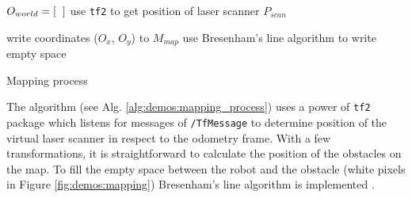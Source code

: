 \vspace*{.4cm}
\begin{algorithm}[H]

$ O_{world} = [\hspace{2mm}] $ 
use \texttt{tf2} to get position of laser scanner $ P_{scan} $\;


write coordinates ($O_{x}$, $O_{y}$) to $ M_{map} $\;
use Bresenham's line algorithm to write empty space\;

\caption{Mapping process}
\label{alg:demos:mapping_process}
\end{algorithm}
\vspace*{.4cm}

The algorithm (see Alg. \ref{alg:demos:mapping_process}) uses a power of \texttt{tf2} package which listens for messages of \texttt{/TfMessage} to determine position of the virtual laser scanner in respect to the odometry frame.
With a few transformations, it is straightforward to calculate the position of the obstacles on the map.
To fill the empty space between the robot and the obstacle (white pixels in Figure \ref{fig:demos:mapping}) Bresenham's line algorithm is implemented \cite{borenstein_measurement_1996}.


